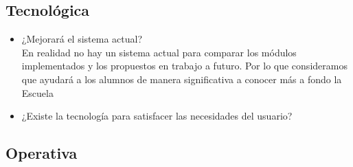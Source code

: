 \subsection{Tecnológica}
	\begin{itemize}
		\item ¿Mejorará el sistema actual?\\
		En realidad no hay un sistema actual para comparar los módulos implementados y los propuestos en trabajo a futuro. Por lo que consideramos que ayudará a los alumnos de manera significativa a conocer más a fondo la Escuela
		\item ¿Existe la tecnología para satisfacer las necesidades del usuario?
		
	\end{itemize}
\subsection{Operativa}

